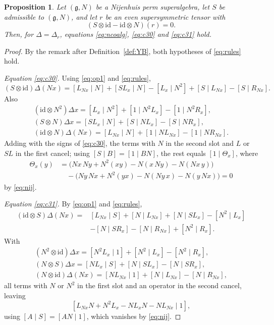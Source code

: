 \documentclass[11pt]{article}
\newtheorem{proposition}[theorem]{Proposition}
\theoremstyle{definition}
\newcommand{\g}{\mathfrak{g}}
\newcommand{\id}{\mathrm{id}}
\begin{document}
\begin{proposition}\label{prop:nijcond}
Let $(\g,N)$ be a Nijenhuis perm superalgebra, let $S$ be admissible to $(\g,N)$, and let $r$ be an even supersymmetric tensor with
\[
(S\otimes\id-\id\otimes N)(r)=0.
\]
Then, for $\Delta=\Delta_r$, equations \eqref{eq:ncoalg}, \eqref{eq:c30} and \eqref{eq:c31} hold.
\end{proposition}
\begin{proof}
By the remark after Definition~\ref{def:YB}, both hypotheses of \eqref{eq:rules} hold.

\emph{Equation \eqref{eq:c30}.}
Using \eqref{eq:op1} and \eqref{eq:rules},
\[
(S\otimes\id)\Delta(Nx)
=[L_{Nx}\mid N]+[SL_x\mid N]-[L_x\mid N^2]+[S\mid L_{Nx}]-[S\mid R_{Nx}].
\]
Also
\[
\begin{gathered}
(\id\otimes N^2)\Delta x=[L_x\mid N^2]+[1\mid N^2L_x]-[1\mid N^2R_x],\\
(S\otimes N)\Delta x=[SL_x\mid N]+[S\mid NL_x]-[S\mid NR_x],\\
(\id\otimes N)\Delta(Nx)=[L_{Nx}\mid N]+[1\mid NL_{Nx}]-[1\mid NR_{Nx}].
\end{gathered}
\]
Adding with the signs of \eqref{eq:c30}, the terms with $N$ in the second slot and $L$ or $SL$ in the first cancel; using $[S\mid B]=[1\mid BN]$, the rest equals $[1\mid\Theta_x]$, where
\[
\begin{aligned}
\Theta_x(y)
&=\bigl(Nx\,Ny+N^2(xy)-N(x\,Ny)-N(Nx\,y)\bigr)\\
&\quad-\bigl(Ny\,Nx+N^2(yx)-N(Ny\,x)-N(y\,Nx)\bigr)=0
\end{aligned}
\]
by \eqref{eq:nij}.

\emph{Equation \eqref{eq:c31}.}
By \eqref{eq:op1} and \eqref{eq:rules},
\[
\begin{aligned}
(\id\otimes S)\Delta(Nx)
={}&[L_{Nx}\mid S]+[N\mid L_{Nx}]+[N\mid SL_x]-[N^2\mid L_x]\\
&-[N\mid SR_x]-[N\mid R_{Nx}]+[N^2\mid R_x].
\end{aligned}
\]
With
\[
\begin{gathered}
(N^2\otimes\id)\Delta x=[N^2L_x\mid 1]+[N^2\mid L_x]-[N^2\mid R_x],\\
(N\otimes S)\Delta x=[NL_x\mid S]+[N\mid SL_x]-[N\mid SR_x],\\
(N\otimes\id)\Delta(Nx)=[NL_{Nx}\mid 1]+[N\mid L_{Nx}]-[N\mid R_{Nx}],
\end{gathered}
\]
all terms with $N$ or $N^2$ in the first slot and an operator in the second cancel, leaving
\[
[L_{Nx}N+N^2L_x-NL_xN-NL_{Nx}\mid 1],
\]
using $[A\mid S]=[AN\mid 1]$, which vanishes by \eqref{eq:nij}.


\end{proof}
\end{document}
